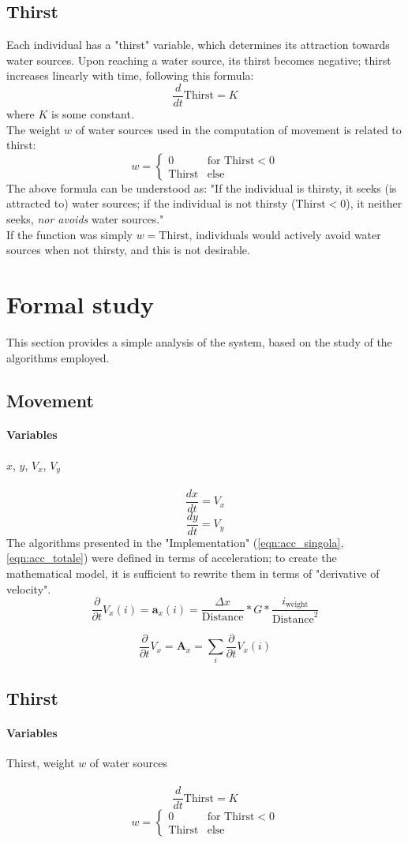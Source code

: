 \documentclass{article}
\begin{document}
\subsection{Thirst}
Each individual has a "thirst" variable, which determines its attraction towards water sources. Upon reaching a water source, its thirst becomes negative; thirst increases linearly with time, following this formula:
\[
\frac{d}{dt}\text{Thirst} = K
\]
where $K$ is some constant.\\
The weight $w$ of water sources used in the computation of movement is related to thirst:
\[
w = \begin{cases}
0&\text{for Thirst}<0\\
\text{Thirst}&\text{else}
\end{cases}
\]
The above formula can be understood as: "If the individual is thirsty, it seeks (is attracted to) water sources; if the individual is not thirsty ($\text{Thirst}<0$), it neither seeks, \textit{nor avoids} water sources."\\
If the function was simply $w = \text{Thirst}$, individuals would actively avoid water sources when not thirsty, and this is not desirable.
\section{Formal study}
This section provides a simple analysis of the system, based on the study of the algorithms employed.

\subsection{Movement}
\paragraph{Variables} $x$, $y$, $V_x$, $V_y$\\
\\
\[
\frac{dx}{dt}=V_x
\]
\[
\frac{dy}{dt}=V_y
\]
The algorithms presented in the "Implementation" (\ref{eqn:acc_singola}, \ref{eqn:acc_totale}) were defined in terms of acceleration; to create the mathematical model, it is sufficient to rewrite them in terms of "derivative of velocity".
\[
\frac{\partial}{\partial t}V_x(i) = \mathbf{a}_x(i) = \frac{\Delta x}{\text{Distance}}*G*\frac{i_\text{weight}}{\text{Distance}^2}
\]

\[
\frac{\partial}{\partial t}V_x = \mathbf{A}_x = \sum_i \frac{\partial}{\partial t}V_x(i)
\]

\subsection{Thirst}
\paragraph{Variables} Thirst, weight $w$ of water sources\\
\\
\[
\frac{d}{dt}\text{Thirst} = K
\]
\[
w = \begin{cases}
0&\text{for Thirst}<0\\
\text{Thirst}&\text{else}
\end{cases}
\]
\end{document}

